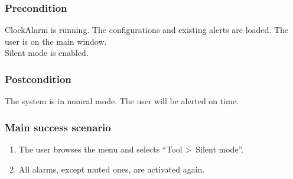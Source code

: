 \subsubsection{Precondition}
ClockAlarm is running. The configurations and existing alerts are loaded. The user is on the main window.
\\Silent mode is enabled.
\subsubsection{Postcondition}
The system is in nomral mode. The user will be alerted on time.
\subsubsection{Main success scenario}
\begin{enumerate}
	\item The user browses the menu and selects ``Tool \textgreater~Silent mode''.
	\item All alarms, except muted ones, are activated again.
\end{enumerate}